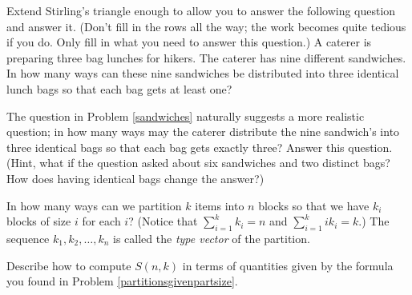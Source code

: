 \item  Extend Stirling's triangle enough to allow you to answer the
following question and answer it.  (Don't fill in the rows all the way;
the work becomes quite tedious if you do.  Only fill in what you need to
answer this question.)  A caterer is preparing three bag lunches for
hikers.  The caterer has nine different sandwiches.  In how many ways can
these nine sandwiches be distributed into three identical lunch bags so
that each bag gets at least one?\label{sandwiches}

\item  The question in Problem \ref{sandwiches} naturally suggests a more
realistic question; in how many ways may the caterer distribute the nine
sandwich's into three identical bags so that each bag gets exactly
three?  Answer this question.  (Hint, what if the question asked about
six sandwiches and two distinct bags?  How does having identical bags
change the answer?)\label{caterer2}

\iteme In how many ways can we partition $k$ items into $n$ blocks so that
we have $k_i$ blocks of size $i$ for each $i$?  (Notice that
$\sum_{i=1}^k k_i = n$ and $
\sum_{i=1}^k ik_i = k$.)\label{partitionsgivenpartsize}  The sequence
$k_1,k_2,\ldots,k_n$ is called the {\em type vector} of the
partition.

\item Describe how to compute $S(n,k)$ in terms of quantities given by
the formula you found in Problem \ref{partitionsgivenpartsize}.

